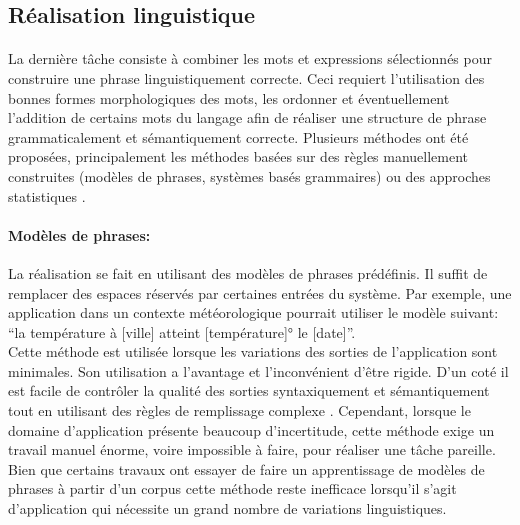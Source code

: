 	\subsection{Réalisation linguistique}
	\paragraph{}
	La dernière tâche consiste à combiner les mots et expressions sélectionnés pour construire une phrase linguistiquement correcte. Ceci requiert l’utilisation des bonnes formes morphologiques des mots, les ordonner et éventuellement  l’addition de certains mots du langage afin de réaliser une structure de phrase grammaticalement et sémantiquement correcte. Plusieurs méthodes ont été proposées, principalement les méthodes basées sur des règles manuellement construites (modèles de phrases, systèmes basés grammaires) ou des approches statistiques \cite{Gatt2018}.
	\paragraph{Modèles de phrases:} La réalisation se fait en utilisant des modèles de phrases prédéfinis. Il suffit de remplacer des espaces réservés par certaines entrées du système. Par exemple, une application dans un contexte météorologique pourrait utiliser le modèle suivant: “la température à [ville] atteint [température]° le [date]”.\\
Cette méthode est utilisée lorsque les variations des sorties de l’application sont minimales. Son utilisation a l’avantage et l’inconvénient d’être rigide. D’un coté il est facile de contrôler la qualité des sorties syntaxiquement et sémantiquement tout en utilisant des règles de remplissage complexe \cite{Theune2001}. Cependant, lorsque le domaine d’application présente beaucoup d’incertitude, cette méthode exige un travail manuel énorme, voire impossible à faire, pour réaliser une tâche pareille. Bien que certains travaux ont essayer de faire un apprentissage de modèles de phrases à partir d’un corpus\cite{Angeli2012} cette méthode reste inefficace lorsqu’il s’agit d’application qui nécessite un grand nombre de variations linguistiques.
